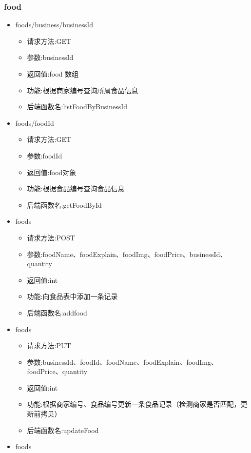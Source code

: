 \subsubsection*{food}
\begin{itemize}
   
    \item foods/business/{businessId}
     \begin{itemize}
    \item 请求方法:GET
    \item 参数:businessId
    \item 返回值:food 数组
    \item 功能:根据商家编号查询所属食品信息
    \item 后端函数名:listFoodByBusinessId
    \end{itemize}
    \item foods/{foodId}
    \begin{itemize} 
    \item 请求方法:GET
    \item 参数:foodId
    \item 返回值:food对象
    \item 功能:根据食品编号查询食品信息
    \item 后端函数名:getFoodById
    \end{itemize}
    \item foods
    \begin{itemize}
    \item 请求方法:POST
    \item 参数:foodName、foodExplain、foodImg、foodPrice、businessId、quantity
    \item 返回值:int
    \item 功能:向食品表中添加一条记录
    \item 后端函数名:addfood
    \end{itemize}
    \item foods
    \begin{itemize}
    \item 请求方法:PUT
    \item 参数:businessId、foodId、foodName、foodExplain、foodImg、foodPrice、quantity
    \item 返回值:int
    \item 功能:根据商家编号、食品编号更新一条食品记录（检测商家是否匹配，更新前拷贝）
    \item 后端函数名:updateFood
    \end{itemize}
    \item foods

\end{itemize}
